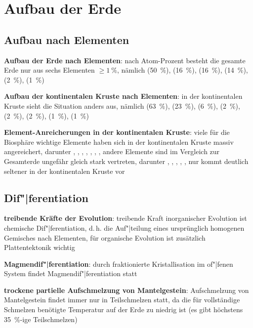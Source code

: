 \chapter{%
    Aufbau der Erde%
}

\section{%
    Aufbau nach Elementen%
}

\textbf{Aufbau der Erde nach Elementen}:
nach Atom-Prozent besteht die gesamte Erde nur aus sechs Elementen $\ge \SI{1}{\percent}$,
nämlich
 (\SI{50}{\percent}),
 (\SI{16}{\percent}),
 (\SI{16}{\percent}),
 (\SI{14}{\percent}),
 (\SI{2}{\percent}),
 (\SI{1}{\percent})

\textbf{Aufbau der kontinentalen Kruste nach Elementen}:
in der kontinentalen Kruste sieht die Situation anders aus, nämlich
 (\SI{63}{\percent}),
 (\SI{23}{\percent}),
 (\SI{6}{\percent}),
 (\SI{2}{\percent}),
 (\SI{2}{\percent}),
 (\SI{2}{\percent}),
 (\SI{1}{\percent}),
 (\SI{1}{\percent})

\textbf{Element-Anreicherungen in der kontinentalen Kruste}:
viele für die Biosphäre wichtige Elemente haben sich in der kontinentalen Kruste massiv
angereichert, darunter , , , , , , ,
andere Elemente sind im Vergleich zur Gesamterde ungefähr gleich stark vertreten,
darunter , , , , ,
nur  kommt deutlich seltener in der kontinentalen Kruste vor

\section{%
    Dif"|ferentiation%
}

\textbf{treibende Kräfte der Evolution}:
treibende Kraft inorganischer Evolution ist chemische Dif"|ferentiation,
d.\,h. die Auf"|teilung eines ursprünglich homogenen Gemisches nach Elementen,
für organische Evolution ist zusätzlich Plattentektonik wichtig

\textbf{Magmendif"|ferentiation}:
durch fraktionierte Kristallisation im of"|fenen System findet Magmendif"|ferentiation statt

\textbf{trockene partielle Aufschmelzung von Mantelgestein}:
Aufschmelzung von Mantelgestein findet immer nur in Teilschmelzen statt,
da die für vollständige Schmelzen benötigte Temperatur auf der Erde zu niedrig ist
(es gibt höchstens \SI{35}{\percent}-ige Teilschmelzen)

